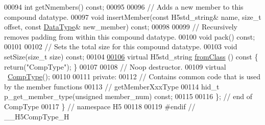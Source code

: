 \begin{DoxyCode}
00094         \textcolor{keywordtype}{int} getNmembers() \textcolor{keyword}{const};
00095 
00096         \textcolor{comment}{// Adds a new member to this compound datatype.}
00097         \textcolor{keywordtype}{void} insertMember(\textcolor{keyword}{const} H5std\_string& name, \textcolor{keywordtype}{size\_t} offset, \textcolor{keyword}{const} 
      \hyperlink{class_h5_1_1_data_type}{DataType}& new\_member) \textcolor{keyword}{const};
00098 
00099         \textcolor{comment}{// Recursively removes padding from within this compound datatype.}
00100         \textcolor{keywordtype}{void} pack() \textcolor{keyword}{const};
00101 
00102         \textcolor{comment}{// Sets the total size for this compound datatype.}
00103         \textcolor{keywordtype}{void} setSize(\textcolor{keywordtype}{size\_t} size) \textcolor{keyword}{const};
00104 
\hyperlink{class_h5_1_1_comp_type_a2413f08e41c809f5cc1a9f3ea9fe32fd}{00106}         \textcolor{keyword}{virtual} H5std\_string \hyperlink{class_h5_1_1_comp_type_a2413f08e41c809f5cc1a9f3ea9fe32fd}{fromClass} ()\textcolor{keyword}{ const }\{ \textcolor{keywordflow}{return}(\textcolor{stringliteral}{"CompType"}); \}
00107 
00108         \textcolor{comment}{// Noop destructor.}
00109         \textcolor{keyword}{virtual} ~\hyperlink{class_h5_1_1_comp_type}{CompType}();
00110 
00111    \textcolor{keyword}{private}:
00112         \textcolor{comment}{// Contains common code that is used by the member functions}
00113         \textcolor{comment}{// getMemberXxxType}
00114         hid\_t p\_get\_member\_type(\textcolor{keywordtype}{unsigned} member\_num) \textcolor{keyword}{const};
00115 
00116 \}; \textcolor{comment}{// end of CompType}
00117 \} \textcolor{comment}{// namespace H5}
00118 
00119 \textcolor{preprocessor}{#endif // \_\_H5CompType\_H}
\end{DoxyCode}

